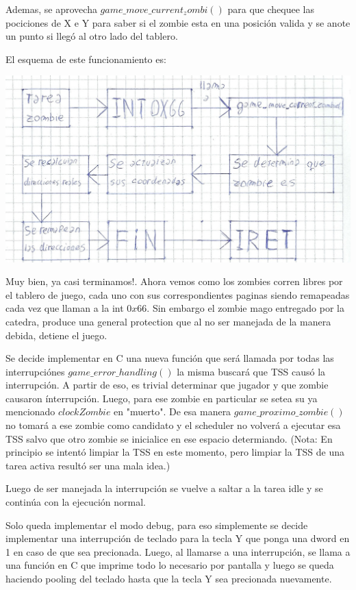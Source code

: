 \documentclass[a4paper]{article}
\begin{document}
Ademas, se aprovecha $game\_move\_current_zombi()$ para que chequee las pociciones de X e Y para saber si el zombie esta en una posición valida y se anote un punto si llegó al otro lado del tablero.

El esquema de este funcionamiento es:


\includegraphics[scale=0.7]{dibujos/dibujo3.jpg}\\
\newpage

Muy bien, ya casi terminamos!. Ahora vemos como los zombies corren libres por el tablero de juego, cada uno con sus correspondientes paginas siendo remapeadas cada vez que llaman a la int $0x66$. Sin embargo el zombie mago entregado por la catedra, produce una general protection que al no ser manejada de la manera debida, detiene el juego.

Se decide implementar en C una nueva función que será llamada por todas las interrupciónes $game\_error\_handling()$ la misma buscará que TSS causó la interrupción. A partir de eso, es trivial determinar que jugador y que zombie causaron ínterrupción. Luego, para ese zombie en particular se setea su ya mencionado $clockZombie$ en "muerto". De esa manera $game\_ proximo\_ zombie()$ no tomará a ese zombie como candidato y el scheduler no volverá a ejecutar esa TSS salvo que otro zombie se inicialice en ese espacio determiando. (Nota: En principio se intentó limpiar la TSS en este momento, pero limpiar la TSS de una tarea activa resultó ser una mala idea.)

Luego de ser manejada la interrupción se vuelve a saltar a la tarea idle y se continúa con la ejecución normal.

Solo queda implementar el modo debug, para eso simplemente se decide implementar una interrupción de teclado para la tecla Y que ponga una dword en 1 en caso de que sea precionada. Luego, al llamarse a una interrupción, se llama a una función en C que imprime todo lo necesario por pantalla y luego se queda haciendo pooling del teclado hasta que la tecla Y sea precionada nuevamente.
\end{document}
